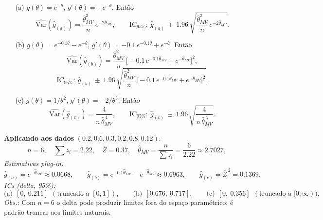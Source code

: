 \smallskip
\begin{itemize}
\item[(a)] $g(\theta)=e^{-\theta}$, $g'(\theta)=-e^{-\theta}$. Então
\[
\widehat{\mathrm{Var}}(\widehat g_{(a)})
=\frac{\widehat\theta_{MV}^2}{n}\,e^{-2\widehat\theta_{MV}},
\qquad
\text{IC}_{95\%}:\ \widehat g_{(a)}\ \pm\ 1.96\,
\sqrt{\frac{\widehat\theta_{MV}^2}{n}\,e^{-2\widehat\theta_{MV}}}.
\]
\item[(b)] $g(\theta)=e^{-0.1\theta}-e^{-\theta}$,
\(
g'(\theta)=-0.1\,e^{-0.1\theta}+e^{-\theta}.
\)
Então
\[
\widehat{\mathrm{Var}}(\widehat g_{(b)})
=\frac{\widehat\theta_{MV}^2}{n}\,\bigl[-0.1\,e^{-0.1\widehat\theta_{MV}}+e^{-\widehat\theta_{MV}}\bigr]^2,
\]
\[
\text{IC}_{95\%}:\ \widehat g_{(b)}\ \pm\ 1.96\,
\sqrt{\frac{\widehat\theta_{MV}^2}{n}\,\bigl[-0.1\,e^{-0.1\widehat\theta_{MV}}+e^{-\widehat\theta_{MV}}\bigr]^2}.
\]
\item[(c)] $g(\theta)=1/\theta^2$, $g'(\theta)=-2/\theta^3$. Então
\[
\widehat{\mathrm{Var}}(\widehat g_{(c)})
=\frac{4}{n\,\widehat\theta_{MV}^{\,4}},
\qquad
\text{IC}_{95\%}:\ \widehat g_{(c)}\ \pm\ 1.96\,\sqrt{\frac{4}{n\,\widehat\theta_{MV}^{\,4}}}.
\]
\end{itemize}

\medskip
\textbf{Aplicando aos dados} $(0.2,0.6,0.3,0.2,0.8,0.12)$:
\[
n=6,\quad \textstyle\sum z_i=2.22,\quad \overline Z=0.37,\quad
\widehat\theta_{MV}=\frac{n}{\sum z_i}=\frac{6}{2.22}\approx 2.7027.
\]
\emph{Estimativas plug-in:}
\[
\widehat g_{(a)}=e^{-\widehat\theta_{MV}}\approx 0.0668,\qquad
\widehat g_{(b)}=e^{-0.1\widehat\theta_{MV}}-e^{-\widehat\theta_{MV}}\approx 0.6963,\qquad
\widehat g_{(c)}=\overline Z^{\,2}=0.1369.
\]
\emph{ICs (delta, 95\%):}
\[
\text{(a)}\ \ [0,\ 0.211]\ \ (\text{truncado a }[0,1]),
\qquad
\text{(b)}\ \ [0.676,\ 0.717],
\qquad
\text{(c)}\ \ [0,\ 0.356]\ \ (\text{truncado a }[0,\infty)).
\]
\textit{Obs.:} Com $n=6$ o delta pode produzir limites fora do espaço paramétrico; é
padrão truncar aos limites naturais.

